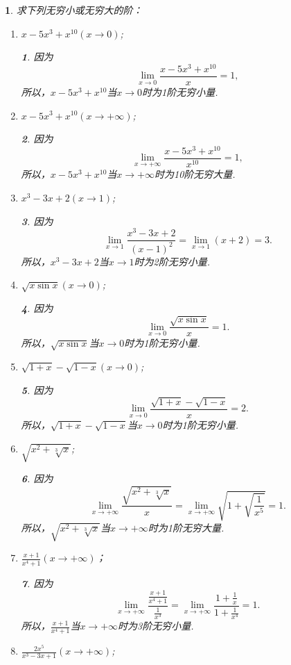 \documentclass[utf8]{book}
\newtheorem{example}{}[section]             %
\newtheorem{solution}{}
\begin{document}
\begin{example}求下列无穷小或无穷大的阶：
\renewcommand\labelenumi{\normalfont(\theenumi)}
\begin{enumerate}
\item $x-5x^3+x^{10}(x\to 0)$;
\begin{solution}因为
$$\displaystyle\lim_{x\to 0}\frac{x-5x^3+x^{10}}{x}=1,$$
所以，$x-5x^3+x^{10}$当$x\to 0$时为1阶无穷小量.
\end{solution}
\item $x-5x^3+x^{10}(x\to +\infty)$;
\begin{solution}因为
$$\displaystyle\lim_{x\to +\infty}\frac{x-5x^3+x^{10}}{x^{10}}=1,$$
所以，$x-5x^3+x^{10}$当$x\to +\infty$时为10阶无穷大量.
\end{solution}
\item $x^3-3x+2(x\to 1)$;
\begin{solution}因为
$$\displaystyle\lim_{x\to 1}\frac{x^3-3x+2}{(x-1)^2}=\displaystyle\lim_{x\to 1}(x+2) = 3.$$
所以，$x^3-3x+2$当$x\to 1$时为2阶无穷小量.
\end{solution}
\item $\sqrt{x\sin{x}}(x\to 0)$;
\begin{solution}因为
$$\displaystyle\lim_{x\to 0}\frac{\sqrt{x\sin{x}}}{x}= 1.$$
所以，$\sqrt{x\sin{x}}$当$x\to 0$时为1阶无穷小量.
\end{solution}
\item $\sqrt{1+x}-\sqrt{1-x}(x\to 0)$;
\begin{solution}因为
$$\displaystyle\lim_{x\to 0}\frac{\sqrt{1+x}-\sqrt{1-x}}{x}= 2.$$
所以，$\sqrt{1+x}-\sqrt{1-x}$当$x\to 0$时为1阶无穷小量.
\end{solution}
\item $\sqrt{x^2+\sqrt[3]{x}}$;
\begin{solution}因为
$$\displaystyle\lim_{x\to +\infty}\frac{\sqrt{x^2+\sqrt[3]{x}}}{x}=\displaystyle\lim_{x\to +\infty}\sqrt{1+\sqrt{\frac{1}{x^5}}}=1.$$
所以，$\sqrt{x^2+\sqrt[3]{x}}$当$x\to +\infty$时为1阶无穷大量.
\end{solution}
\item $\displaystyle\frac{x+1}{x^4+1}(x\to +\infty)$；
\begin{solution}因为
$$\displaystyle\lim_{x\to +\infty}\frac{\displaystyle\frac{x+1}{x^4+1}}{\frac{1}{x^3}}=\displaystyle\lim_{x\to +\infty}\frac{1+\frac{1}{x}}{1+\frac{1}{x^4}}=1.$$
所以，$\displaystyle\frac{x+1}{x^4+1}$当$x\to +\infty$时为3阶无穷小量.
\end{solution}
\item $\displaystyle\frac{2x^5}{x^3-3x+1}(x\to +\infty)$;

\end{enumerate}
\end{example}
\end{document}
